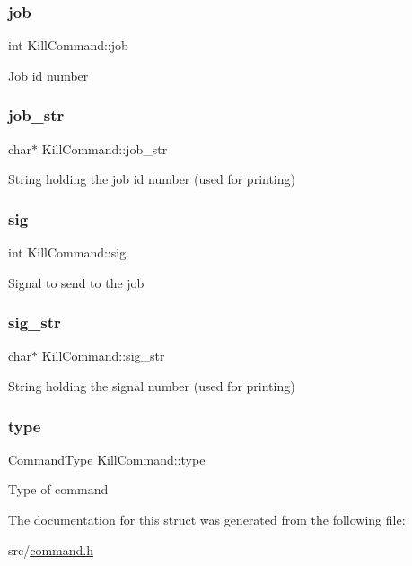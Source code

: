 \subsubsection{\texorpdfstring{job}{job}}
{\footnotesize\ttfamily int Kill\+Command\+::job}

Job id number \mbox{\label{structKillCommand_a174a9714a69550b0bbf611e59bfbf332}} 
\subsubsection{\texorpdfstring{job\+\_\+str}{job\_str}}
{\footnotesize\ttfamily char$\ast$ Kill\+Command\+::job\+\_\+str}

String holding the job id number (used for printing) \mbox{\label{structKillCommand_a20f5367bbec80a936189c57b1f9db351}} 
\subsubsection{\texorpdfstring{sig}{sig}}
{\footnotesize\ttfamily int Kill\+Command\+::sig}

Signal to send to the job \mbox{\label{structKillCommand_a879a36b90427ec640bef5c92a6c9c24e}} 
\subsubsection{\texorpdfstring{sig\+\_\+str}{sig\_str}}
{\footnotesize\ttfamily char$\ast$ Kill\+Command\+::sig\+\_\+str}

String holding the signal number (used for printing) \mbox{\label{structKillCommand_a9cd678bc0659f74340e3fca28766bcda}} 
\subsubsection{\texorpdfstring{type}{type}}
{\footnotesize\ttfamily \hyperlink{command_8h_a21e038f5b8958e203d28bc4f18472352}{Command\+Type} Kill\+Command\+::type}

Type of command 

The documentation for this struct was generated from the following file\+:\begin{DoxyCompactItemize}
\item 
src/\hyperlink{command_8h}{command.\+h}\end{DoxyCompactItemize}
